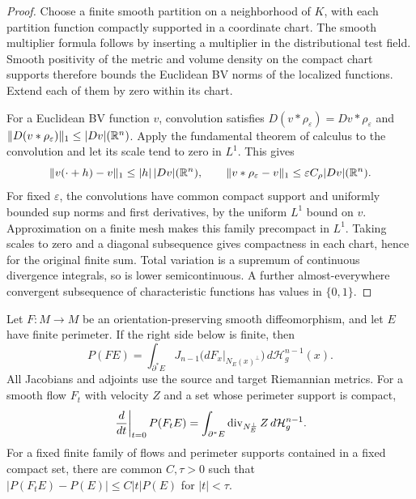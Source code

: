 \begin{proof}
Choose a finite smooth partition on a neighborhood of $K$, with each
partition function compactly supported in a coordinate chart.
The smooth multiplier formula follows by inserting a multiplier in
the distributional test field. Smooth positivity of the metric and
volume density on the compact chart supports therefore bounds the
Euclidean BV norms of the localized functions. Extend each of them
by zero within its chart.

For a Euclidean BV function $v$, convolution satisfies
$D(v*\rho_\varepsilon)=Dv*\rho_\varepsilon$ and
$\|D(v*\rho_\varepsilon)\|_1\le |Dv|(\mathbb R^n)$.
Apply the fundamental theorem of calculus to the convolution and let
its scale tend to zero in $L^1$. This gives
\[
 \|v(\cdot+h)-v\|_1\le |h|\,|Dv|(\mathbb R^n),\qquad
 \|v*\rho_\varepsilon-v\|_1
 \le\varepsilon C_\rho |Dv|(\mathbb R^n).
\]
For fixed $\varepsilon$, the convolutions have common compact support
and uniformly bounded sup norms and first derivatives, by the uniform
$L^1$ bound on $v$. Approximation on a finite mesh makes this family
precompact in $L^1$. Taking scales to zero and a diagonal subsequence
gives compactness in each chart, hence for the original finite sum.
Total variation is a supremum of continuous divergence integrals, so
is lower semicontinuous. A further almost-everywhere convergent
subsequence of characteristic functions has values in $\{0,1\}$.
\end{proof}

\begin{lemma}\label{lem:bv-flow}
Let $F:M\to M$ be an orientation-preserving smooth diffeomorphism,
and let $E$ have finite perimeter. If the right side below is finite,
then
\begin{equation}\label{eq:bv-flow-jacobian}
 P(FE)=\int_{\partial^*E}
 J_{n-1}\bigl(dF_x|_{N_E(x)^\perp}\bigr)\,d\mathcal H_g^{n-1}(x).
\end{equation}
All Jacobians and adjoints use the source and target Riemannian
metrics. For a smooth flow $F_t$ with velocity $Z$ and a set whose
perimeter support is compact,
\begin{equation}\label{eq:bv-flow-first-variation}
 \left.\frac d{dt}\right|_{t=0}P(F_tE)
 =\int_{\partial^*E}\operatorname{div}_{N_E^\perp}Z\,d\mathcal H_g^{n-1}.
\end{equation}
For a fixed finite family of flows and perimeter supports contained
in a fixed compact set, there are common $C,\tau>0$ such that
$|P(F_tE)-P(E)|\le C|t|P(E)$ for $|t|<\tau$.
\end{lemma}

